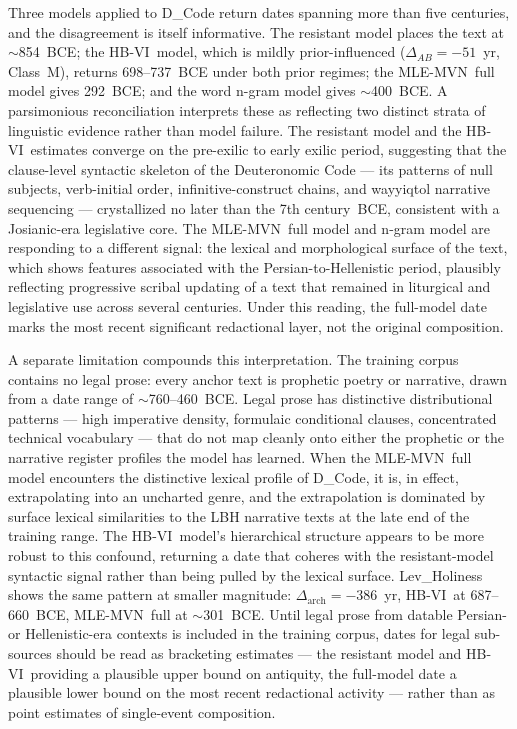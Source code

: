 \documentclass[10pt,letterpaper]{article}
\newcommand{\mvn}{MLE-MVN}
\newcommand{\hbvi}{HB-VI}
\begin{document}
Three models applied to D\_Code return dates spanning more than five
centuries, and the disagreement is itself informative.  The resistant
model places the text at $\sim$854~BCE; the \hbvi\ model, which is mildly
prior-influenced ($\Delta_{AB} = -51$~yr, Class~M), returns 698--737~BCE
under both prior regimes; the \mvn\ full model gives 292~BCE; and the
word n-gram model gives $\sim$400~BCE.  A parsimonious reconciliation
interprets these as reflecting two distinct strata of linguistic
evidence rather than model failure.  The resistant model and the \hbvi\
estimates converge on the pre-exilic to early exilic period, suggesting
that the clause-level syntactic skeleton of the Deuteronomic Code --- its
patterns of null subjects, verb-initial order, infinitive-construct
chains, and wayyiqtol narrative sequencing --- crystallized no later than
the 7th century~BCE, consistent with a Josianic-era legislative core.
The \mvn\ full model and n-gram model are responding to a different
signal: the lexical and morphological surface of the text, which shows
features associated with the Persian-to-Hellenistic period, plausibly
reflecting progressive scribal updating of a text that remained in
liturgical and legislative use across several centuries.  Under this
reading, the full-model date marks the most recent significant
redactional layer, not the original composition.

A separate limitation compounds this interpretation.  The training corpus
contains no legal prose: every anchor text is prophetic poetry or
narrative, drawn from a date range of $\sim$760--460~BCE.  Legal
prose has distinctive distributional patterns --- high imperative density,
formulaic conditional clauses, concentrated technical vocabulary --- that
do not map cleanly onto either the prophetic or the narrative register
profiles the model has learned.  When the \mvn\ full model encounters
the distinctive lexical profile of D\_Code, it is, in effect,
extrapolating into an uncharted genre, and the extrapolation is
dominated by surface lexical similarities to the LBH narrative texts at
the late end of the training range.  The \hbvi\ model's hierarchical
structure appears to be more robust to this confound, returning a date
that coheres with the resistant-model syntactic signal rather than being
pulled by the lexical surface.  Lev\_Holiness shows the same pattern at
smaller magnitude: $\Delta_{\text{arch}} = -$386~yr, \hbvi\ at
687--660~BCE, \mvn\ full at $\sim$301~BCE.  Until legal prose from
datable Persian- or Hellenistic-era contexts is included in the training
corpus, dates for legal sub-sources should be read as bracketing estimates
--- the resistant model and \hbvi\ providing a plausible upper bound on
antiquity, the full-model date a plausible lower bound on the most recent
redactional activity --- rather than as point estimates of single-event
composition.
\end{document}
